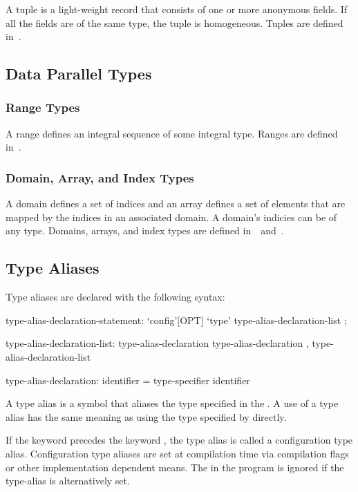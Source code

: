 A tuple is a light-weight record that consists of one or more
anonymous fields.  If all the fields are of the same type, the tuple
is homogeneous.  Tuples are defined in~.

\subsection{Data Parallel Types}
\label{Data_Parallel_Types}

\subsubsection{Range Types}

A range defines an integral sequence of some integral type.  Ranges
are defined in~.

\subsubsection{Domain, Array, and Index Types}
\label{Domain_and_Array_Types}

A domain defines a set of indices and an array defines a set of
elements that are mapped by the indices in an associated domain.  A
domain's indicies can be of any type.  Domains, arrays, and index
types are defined in~~and~.

\subsection{Type Aliases}
\label{Type_Aliases}

Type aliases are declared with the following syntax:
\begin{syntax}
type-alias-declaration-statement:
  `config'[OPT] `type' type-alias-declaration-list ;

type-alias-declaration-list:
  type-alias-declaration
  type-alias-declaration , type-alias-declaration-list

type-alias-declaration:
  identifier = type-specifier
  identifier
\end{syntax}
A type alias is a symbol that aliases the type specified in the
.  A use of a type alias has the same meaning as using
the type specified by  directly.

If the keyword  precedes the keyword , the
type alias is called a configuration type alias.  Configuration type
aliases are set at compilation time via compilation flags or other
implementation dependent means.  The  in the
program is ignored if the type-alias is alternatively set.


